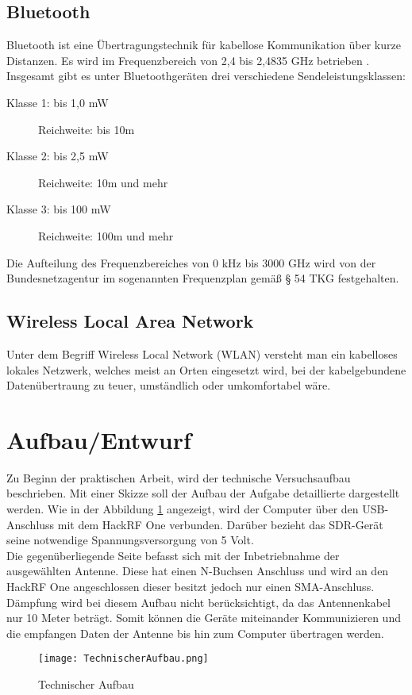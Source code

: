 \subsection{Bluetooth}
Bluetooth ist eine Übertragungstechnik für kabellose Kommunikation über kurze Distanzen. Es wird im Frequenzbereich von 2,4 bis 2,4835 GHz betrieben \cite[Bundesamt für Strahlenschutz, S. 1]{bundesamt-strahlungsschutz:2012}. Insgesamt gibt es unter Bluetoothgeräten drei verschiedene Sendeleistungsklassen:
\begin{description}
	\item[Klasse 1: bis 1,0 mW] Reichweite: bis 10m 
	\item [Klasse 2: bis 2,5 mW] Reichweite: 10m und mehr
	\item [Klasse 3: bis 100 mW] Reichweite: 100m und mehr
\end{description}
Die Aufteilung des Frequenzbereiches von 0 kHz bis 3000 GHz wird von der Bundesnetzagentur im sogenannten Frequenzplan \cite[Bundesnetzagentur]{bundesnetzagentur-frequenzplan:2016} gemäß § 54 TKG festgehalten.





\subsection{Wireless Local Area Network}
Unter dem Begriff Wireless Local Network (WLAN) versteht man ein kabelloses lokales Netzwerk, welches meist an Orten eingesetzt wird, bei der kabelgebundene Datenübertraung zu teuer, umständlich oder umkomfortabel wäre.


\section{Aufbau/Entwurf}
Zu Beginn der praktischen Arbeit, wird der technische Versuchsaufbau beschrieben. Mit einer Skizze soll der Aufbau der Aufgabe detaillierte dargestellt werden. Wie in der Abbildung \ref{Technischer Aufbau} angezeigt, wird der Computer über den USB-Anschluss mit dem HackRF One verbunden. Darüber bezieht das SDR-Gerät seine notwendige Spannungsversorgung von 5 Volt.\\
Die gegenüberliegende Seite befasst sich mit der Inbetriebnahme der ausgewählten Antenne. Diese hat einen N-Buchsen Anschluss und wird an den HackRF One angeschlossen dieser besitzt jedoch nur einen SMA-Anschluss. Dämpfung wird bei diesem Aufbau nicht berücksichtigt, da das Antennenkabel nur 10 Meter beträgt. Somit können die Geräte miteinander Kommunizieren und die empfangen Daten der Antenne bis hin zum Computer übertragen werden.  
\begin{figure}[H]
	\centering
	\texttt{[image: TechnischerAufbau.png]}
	\caption[Technischer Aufbau]{Technischer Aufbau} 
	\label{Technischer Aufbau}
\end{figure}

